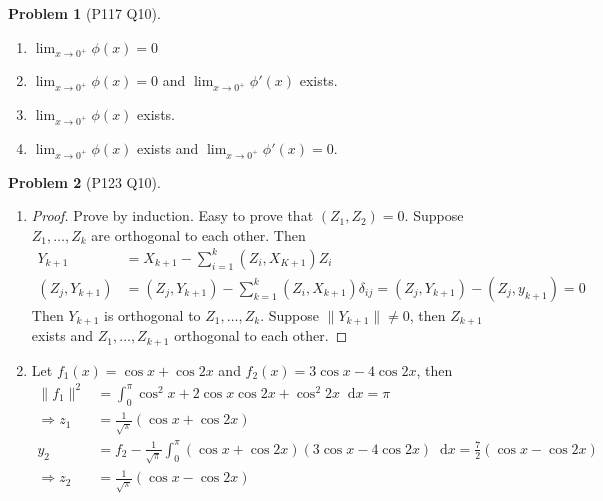 \documentclass[twoside,11pt]{article}
\renewcommand*\d{\mathop{}\!\mathrm{d}}
\theoremstyle{definition}
\newtheorem{problem}{Problem}
\theoremstyle{remark}
\begin{document}
\begin{problem}[P117 Q10]\
\begin{enumerate}[label=(\alph*)]
\item $\lim_{x\rightarrow 0^+} \phi(x) = 0$

\item $\lim_{x\rightarrow 0^+} \phi(x) = 0$ and $\lim_{x\rightarrow 0^+}\phi'(x)$ exists.

\item $\lim_{x\rightarrow 0^+} \phi(x)$ exists.

\item $\lim_{x\rightarrow 0^+} \phi(x)$ exists and $\lim_{x\rightarrow 0^+}\phi'(x)=0$.


\end{enumerate}
\end{problem}


\begin{problem}[P123 Q10]\
\begin{enumerate}[label=(\alph*)]
\item \begin{proof}
Prove by induction.
Easy to prove that $(Z_1, Z_2)=0$.
Suppose $Z_1,\dots,Z_k$ are orthogonal to each other.
Then 
\begin{align*}
    Y_{k+1} &= X_{k+1} - \sum_{i=1}^k (Z_i, X_{K+1})Z_i\\
    (Z_j, Y_{k+1}) &= (Z_j, Y_{k+1}) - \sum_{k=1}^k (Z_i, X_{k+1})\delta_{ij}
    = (Z_j, Y_{k+1}) - (Z_j, y_{k+1}) = 0
\end{align*}
Then $Y_{k+1}$ is orthogonal to $Z_1,\dots,Z_k$.
Suppose $\|Y_{k+1}\|\neq 0$, then $Z_{k+1}$ exists and
$Z_1,\dots,Z_{k+1}$ orthogonal to each other.
\end{proof}

\item Let $f_1(x) = \cos x + \cos 2x$ and $f_2(x) = 3\cos x - 4\cos 2x$, then
\begin{align*}
    \|f_1\|^2 &= 
    \int_0^\pi \cos^2 x + 2\cos x\cos 2x + \cos^2 2x\d x
    = \pi\\
    \Rightarrow z_1 &= \frac{1}{\sqrt{\pi}}(\cos x + \cos 2x)\\
    y_2 &= f_2 - \frac{1}{\sqrt{\pi}}\int_0^\pi 
    (\cos x + \cos 2x)(3\cos x - 4\cos 2x)\d x
    = \frac{7}{2}(\cos x - \cos 2x)\\
    \Rightarrow z_2 &= \frac{1}{\sqrt{\pi}}(\cos x - \cos 2x)
\end{align*}

\end{enumerate}
\end{problem}
\end{document}
